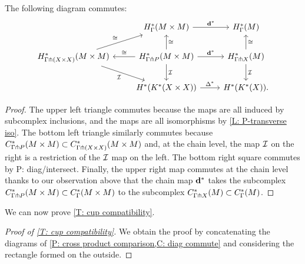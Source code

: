 \documentclass{amsart}
\begin{document}
\begin{corollary}\label{C: diag commute}
	The following diagram commutes:
	\[
	\begin{tikzcd}
		&H^*_{\Gamma}(M \times M) \arrow[r,"\diag^*"]& H^*_{\Gamma}(M) \\
	H^*_{\Gamma \pf (X \times X)}(M \times M)  \arrow[rd,"\mc I"']\arrow[ru,"\cong"] & \arrow[l,"\cong"']H^*_{\Gamma \pf P}(M \times M) \arrow[r,"\diag^*"] \arrow[d,"\mc I"] \arrow[u,"\cong"']& H^*_{\Gamma \pf X}(M) \arrow[d,"\mc I"] \arrow[u,"\cong"'] \\
		&H^*(K^*(X\times X))	\arrow[r,"\Delta^*"] & H^*(K^*(X)) .
	\end{tikzcd}
	\]
\end{corollary}
\begin{proof}
	The upper left triangle commutes because the maps are all induced by subcomplex inclusions, and the maps are all isomorphisms by \cref{L: P-transverse iso}.
	The bottom left triangle similarly commutes because $C^*_{\Gamma \pitchfork P}(M \times M) \subset C^*_{\Gamma \pitchfork (X \times X)}(M \times M)$ and, at the chain level, the map $\mathcal{I}$ on the right is a restriction of the $\mathcal{I}$ map on the left.
	The bottom right square commutes by {P: diag/intersect}.
	Finally, the upper right map commutes at the chain level thanks to our observation above that the chain map $\mathbf{d}^*$ takes the subcomplex $C^*_{\Gamma \pitchfork P}(M \times M) \subset C^*_\Gamma(M \times M)$ to the subcomplex $C^*_{\Gamma \pitchfork X}(M) \subset C^*_\Gamma(M)$.
\end{proof}

We can now prove \cref{T: cup compatibility}.

\begin{proof}[Proof of \cref{T: cup compatibility}]
We obtain the proof by concatenating the diagrams of \cref{P: cross product comparison,C: diag commute} and considering the rectangle formed on the outside.
\end{proof}



\begin{comment}
We also have the following.


\begin{lemma}
	The following diagram commutes:
	\[
	\begin{tikzcd}
		H^*_\Gamma(M) \otimes H^*_\Gamma(M) \arrow[r,"\times"] &H^*_{\Gamma}(M \times M) \\
		H^*_{\Gamma \pf X}(M) \otimes H^*_{\Gamma \pf X}(M) \arrow[r,"\times"]\arrow[d,"\mc I \otimes \mc I"]\arrow[u,"\cong"']  & H^*_{\Gamma \pf (X \times X)}(M \times M)  \arrow[d,"\mc I"]\arrow[u,"\cong"']  \\
		H^*(X) \otimes H^*(X) \arrow[r,"\times"]	&H^*(X\times X) .
	\end{tikzcd}
	\]
\end{lemma}
\begin{proof}
	As the product of two cochains transverse to the cubulation is transverse to the product cubulation PROVE/REF!!!, the diagram at the top commutes at the cochain level.
	For the bottom, we compute

\end{proof}
\end{comment}
\end{document}
